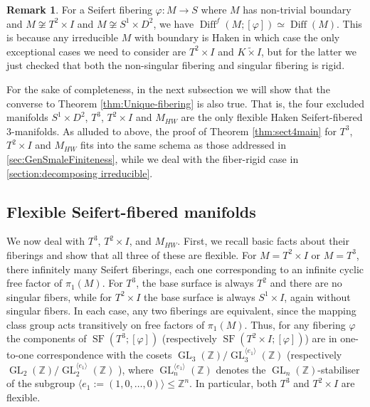 \documentclass{amsart}
\theoremstyle{plain}
\theoremstyle{definition}
\newtheorem{rem}[thm]{Remark}
\DeclareMathOperator\Diff{Diff}
\DeclareMathOperator\GL{GL}
\DeclareMathOperator{\SF}{SF}
\newcommand{\Z}{\mathbb{Z}}
\begin{document}
\begin{rem}\label{rem:most-non-singular-are-rigid}
    For a Seifert fibering $\varphi\colon M \to S$ where $M$ has non-trivial boundary and $M \not\cong T^2 \times I$ and $M \not\cong S^1 \times D^2$, we have $\Diff^f(M; [\varphi]) \simeq \Diff(M)$.
    This is because any irreducible $M$ with boundary is Haken in which case the only exceptional cases we need to consider are $T^2 \times I$ and $K \tilde{\times} I$, but for the latter we just checked that both the non-singular fibering and singular fibering is rigid.
\end{rem}



For the sake of completeness, in the next subsection we will show 
that the converse to Theorem \ref{thm:Unique-fibering} is also true.  That is, the four excluded manifolds $S^1\times D^2$, $T^3$, $T^2\times I$ and $M_{HW}$ are the only flexible Haken Seifert-fibered 3-manifolds. As alluded to above, the proof of Theorem \ref{thm:sect4main} for $T^3$, $T^2\times I$ and $M_{HW}$ fits into the same schema as those addressed in \cref{sec:GenSmaleFiniteness}, while we deal with the fiber-rigid case in \cref{section:decomposing irreducible}.

 
\subsection{Flexible Seifert-fibered manifolds}\label{sec:Flexible} 

We now deal with $T^3$, $T^2\times I$,  and $M_{HW}$. First, we recall basic facts about their fiberings and show that all three of these are flexible. For $M=T^2\times I$ or $M=T^3$, there infinitely many Seifert fiberings, each one corresponding to an infinite cyclic free factor of $\pi_1(M).$ For $T^3$, the base surface is always $T^2$ and there are no singular fibers, while for $T^2\times I$ the base surface is always $S^1\times I$, again without singular fibers. In each case, any two fiberings are equivalent, since the mapping class group acts transitively on free factors of $\pi_1(M)$.  
Thus, for any fibering $\varphi$ the components of $\SF(T^3;[\varphi])$ (respectively $\SF(T^2\times I;[\varphi])$) are in one-to-one correspondence with the cosets $\GL_3(\Z)/\GL_3^{\langle e_1\rangle}(\Z)$ (respectively $\GL_2(\Z)/\GL_2^{\langle e_1\rangle}(\Z)$
), where $\GL_n^{\langle e_1\rangle}(\Z)$ denotes the $\GL_n(\Z)$-stabiliser of the subgroup $\langle e_1:=(1,0,\ldots,0)\rangle\leq\Z^n$. In particular, both $T^3$ and $T^2\times I$ are flexible.
\end{document}
